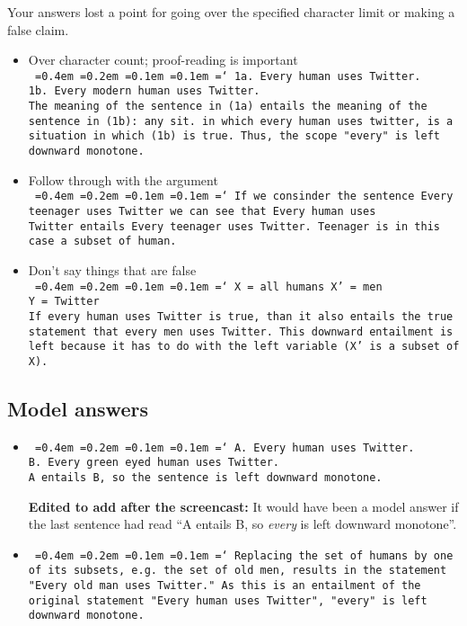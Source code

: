 \documentclass[a4,11pt]{article}
\newcommand*\justify{%
  \fontdimen2\font=0.4em%
  \fontdimen3\font=0.2em%
  \fontdimen4\font=0.1em%
  \fontdimen7\font=0.1em%
  \hyphenchar\font=`\-%
}
\begin{document}
Your answers lost a point for going over the specified character limit or making a false claim.

\begin{itemize}[leftmargin = 12pt]

\item Over character count; proof-reading is important \\ \texttt{\justify 1a. Every human uses Twitter.
\\ 1b. Every modern human uses Twitter.
\\ The meaning of the sentence in (1a) entails the meaning of the sentence in (1b): any sit. in which every human uses twitter, is a situation in which (1b) is true. Thus, the scope "every" is left downward monotone.}

\item Follow through with the argument
\\  \texttt{\justify If we consinder the sentence Every teenager uses Twitter we can see that Every human uses Twitter entails Every teenager uses Twitter. Teenager is in this case a subset of human.}

\item Don't say things that are false
\\  \texttt{\justify X = all humans
\\ X' = men
\\ Y = Twitter\\
If every human uses Twitter is true, than it also entails the true statement that every men uses Twitter.
This downward entailment is left because it has to do with the left variable (X' is a subset of X).}

\end{itemize}

\subsection*{Model answers}

\begin{itemize}[leftmargin = 12pt]

\item \texttt{\justify A. Every human uses Twitter. \\ B. Every green eyed human uses Twitter.
\\ A entails B, so the sentence is left downward monotone.}

{\bf Edited to add after the screencast:} It would have been a model answer if the last sentence had read ``A entails B, so {\em every} is left downward monotone''.

\item \texttt{\justify Replacing the set of humans by one of its subsets, e.g. the set of old men, results in the statement "Every old man uses Twitter." As this is an entailment of the original statement "Every human uses Twitter", "every" is left downward monotone.}



\end{itemize}
\end{document}
